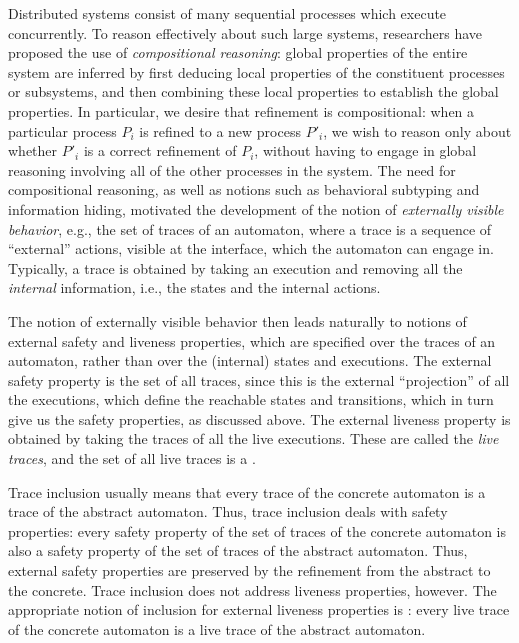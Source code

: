 \documentclass[11pt]{article}
\begin{document}
Distributed systems consist of many sequential processes which execute
concurrently. To reason effectively about such large systems,
researchers have proposed the use of \emph{compositional reasoning}:
global properties of the entire system are inferred by first
deducing local properties of the constituent processes or subsystems, and then
combining these local properties to establish the global properties.
In particular, we desire that refinement is compositional: when a
particular process $P_i$ is refined to a new process $P'_i$, we wish
to reason only about whether $P'_i$ is a correct refinement of $P_i$,
without having to engage in global reasoning involving all of the
other processes in the system. The need for compositional reasoning,
as well as notions such as behavioral subtyping \cite{LW94} and
information hiding, motivated the development of the notion of
\emph{externally visible behavior}, e.g., the set of traces of an
automaton, where a trace is a sequence of ``external'' actions,
visible at the interface, which the automaton can engage in.
Typically, a trace is obtained by taking an execution and removing all
the \emph{internal} information, i.e., the states and the internal actions.

The notion of externally visible behavior then leads naturally to
notions of external safety and liveness properties, which are
specified over the traces of an automaton, rather than over the
(internal) states and executions.
The external safety property is the set of all traces,
since this is the external ``projection'' of all the executions, which
define the reachable states and transitions, which in turn give us the
safety properties, as discussed above.
The external liveness property is obtained by taking the 
traces of all the live executions. These are called the \emph{live
traces}, and the set of all live traces is a . 




Trace inclusion usually means that every trace of the concrete
automaton is a trace of the abstract automaton.  Thus, trace inclusion
deals with safety properties: every safety property of the set of
traces of the concrete automaton is also a safety property of the set
of traces of the abstract automaton. Thus, external
safety properties are preserved by the refinement from the abstract to
the concrete.  Trace inclusion does not address liveness properties,
however.
The appropriate notion of inclusion for external liveness properties is
 \cite{GSSL93,GSSL98}: every live trace of the
concrete automaton is a live trace of the abstract automaton.
\end{document}
